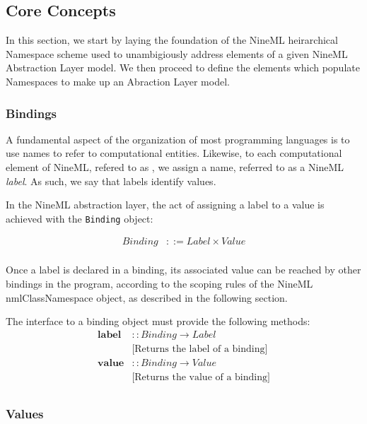 \documentclass[a4paper]{article}
\newcommand\nmlClass[1]{{\tt #1}}
\begin{document}
\subsection{Core Concepts}

In this section, we start by laying the foundation of the NineML
heirarchical Namespace scheme used to unambigiously address elements
of a given NineML Abstraction Layer model.  We then proceed to define the elements 
which populate Namespaces to make up an Abraction Layer model. 

\subsubsection{Bindings}

A fundamental aspect of the organization of most programming languages
is to use names to refer to computational entities.  Likewise, to each
computational element of NineML, refered to as , we
assign a name, referred to as a NineML \emph{label}.  As such, we say
that labels identify values.  

In the NineML abstraction layer, the act of assigning a label to a value is achieved
with the \nmlClass{Binding} object:

\begin{equation*}
\begin{array}{ll}
   Binding & ::= Label \times Value \\
\end{array}
\end{equation*}

Once a label is declared in a binding, its associated value can be
reached by other bindings in the program, according to the scoping
rules of the NineML nmlClass{Namespace} object, as described in the
following section.

The interface to a binding object must provide the following methods:
\begin{equation*}
\begin{array}{ll}
   \mathbf{label} & :: Binding \rightarrow Label \\ & \textrm{[Returns the label of a binding]} \\
   \mathbf{value} & :: Binding \rightarrow Value \\ & \textrm{[Returns the value of a binding]} \\
\end{array}
\end{equation*}


\subsubsection{Values}
\end{document}
